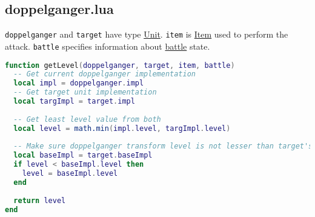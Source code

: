 \subsection{doppelganger.lua}
\texttt{doppelganger} and \texttt{target} have type \hyperref[Unit]{Unit}. \texttt{item} is \hyperref[Item]{Item} used to perform the attack. \texttt{battle} specifies information about \hyperref[Battle]{battle} state.
\begin{center}
\begin{lstlisting}[language=Lua]
function getLevel(doppelganger, target, item, battle)
  -- Get current doppelganger implementation
  local impl = doppelganger.impl
  -- Get target unit implementation
  local targImpl = target.impl
  
  -- Get least level value from both
  local level = math.min(impl.level, targImpl.level)
  
  -- Make sure doppelganger transform level is not lesser than target's base
  local baseImpl = target.baseImpl
  if level < baseImpl.level then
    level = baseImpl.level
  end
  
  return level
end
\end{lstlisting}
\end{center}